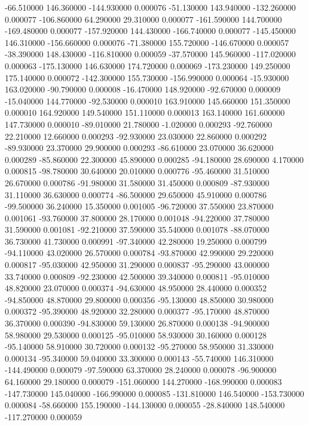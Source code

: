-66.510000 146.360000 -144.930000 0.000076 
-51.130000 143.940000 -132.260000 0.000077 
-106.860000 64.290000 29.310000 0.000077 
-161.590000 144.700000 -169.480000 0.000077 
-157.920000 144.430000 -166.740000 0.000077 
-145.450000 146.310000 -156.660000 0.000076 
-71.380000 155.720000 -146.670000 0.000057 
-38.390000 148.430000 -116.810000 0.000059 
-37.570000 145.960000 -117.020000 0.000063 
-175.130000 146.630000 174.720000 0.000069 
-173.230000 149.250000 175.140000 0.000072 
-142.300000 155.730000 -156.990000 0.000064 
-15.930000 163.020000 -90.790000 0.000008 
-16.470000 148.920000 -92.670000 0.000009 
-15.040000 144.770000 -92.530000 0.000010 
163.910000 145.660000 151.350000 0.000010 
164.920000 149.540000 151.110000 0.000013 
163.140000 161.600000 147.730000 0.000010 
-89.010000 21.780000 -1.020000 0.000293 
-92.760000 22.210000 12.660000 0.000293 
-92.930000 23.030000 22.860000 0.000292 
-89.930000 23.370000 29.900000 0.000293 
-86.610000 23.070000 36.620000 0.000289 
-85.860000 22.300000 45.890000 0.000285 
-94.180000 28.690000 4.170000 0.000815 
-98.780000 30.640000 20.010000 0.000776 
-95.460000 31.510000 26.670000 0.000786 
-91.980000 31.580000 31.450000 0.000809 
-87.930000 31.110000 36.630000 0.000774 
-86.500000 29.650000 45.910000 0.000786 
-99.500000 36.240000 15.350000 0.001005 
-96.720000 37.550000 23.870000 0.001061 
-93.760000 37.800000 28.170000 0.001048 
-94.220000 37.780000 31.590000 0.001081 
-92.210000 37.590000 35.540000 0.001078 
-88.070000 36.730000 41.730000 0.000991 
-97.340000 42.280000 19.250000 0.000799 
-94.110000 43.020000 26.570000 0.000784 
-93.870000 42.990000 29.220000 0.000817 
-95.030000 42.950000 31.290000 0.000837 
-95.290000 43.000000 33.740000 0.000809 
-92.230000 42.500000 39.340000 0.000811 
-95.010000 48.820000 23.070000 0.000374 
-94.630000 48.950000 28.440000 0.000352 
-94.850000 48.870000 29.800000 0.000356 
-95.130000 48.850000 30.980000 0.000372 
-95.390000 48.920000 32.280000 0.000377 
-95.170000 48.870000 36.370000 0.000390 
-94.830000 59.130000 26.870000 0.000138 
-94.900000 58.980000 29.530000 0.000125 
-95.010000 58.930000 30.160000 0.000128 
-95.140000 58.910000 30.720000 0.000132 
-95.270000 58.950000 31.330000 0.000134 
-95.340000 59.040000 33.300000 0.000143 
-55.740000 146.310000 -144.490000 0.000079 
-97.590000 63.370000 28.240000 0.000078 
-96.900000 64.160000 29.180000 0.000079 
-151.060000 144.270000 -168.990000 0.000083 
-147.730000 145.040000 -166.990000 0.000085 
-131.810000 146.540000 -153.730000 0.000084 
-58.660000 155.190000 -144.130000 0.000055 
-28.840000 148.540000 -117.270000 0.000059 
